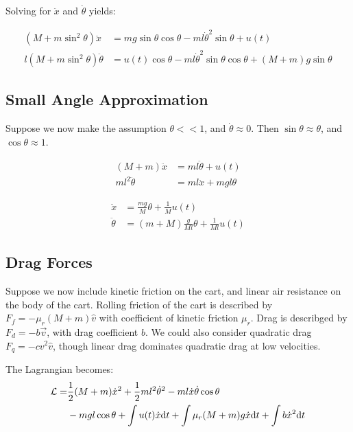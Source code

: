 \documentclass[a4paper,12pt]{article}
\begin{document}
Solving for $\ddot{x}$ and $\ddot{\theta}$ yields:

\begin{align}
    (M+m\sin^2\theta)\ddot{x} &=
        mg\sin\theta \cos\theta - ml\dot{\theta}^2 \sin\theta + u(t) \\
    l(M+m\sin^2\theta) \ddot{\theta} &=
        u(t) \cos\theta - ml\dot{\theta}^2 \sin\theta \cos\theta + (M+m)g\sin\theta
\end{align}

\subsection{Small Angle Approximation}

Suppose we now make the assumption $\theta <<1$, and $\dot{\theta} \approx 0$.
Then $\sin\theta \approx \theta$, and $\cos\theta \approx 1$.

\begin{align*}
    (M+m) \ddot{x} &= ml \ddot{\theta} + u(t) \\
    ml^2 \ddot{\theta} &= ml \ddot{x} + mgl \theta
\end{align*}

\begin{align}
    \ddot{x} &= \frac{mg}{M} \theta + \frac{1}{M} u(t) \\
    \ddot{\theta} &= (m+M)\frac{g}{Ml} \theta + \frac{1}{Ml} u(t)
\end{align}


\subsection{Drag Forces}

Suppose we now include kinetic friction on the cart, and linear air resistance
on the body of the cart. Rolling friction of the cart is described by $F_f =
-\mu_r (M+m)\hat{v}$ with coefficient of kinetic friction $\mu_r$. Drag is
describged by $F_d = -b \vec{v}$, with drag coefficient $b$. We could also
consider quadratic drag $F_q = -c v^2 \hat{v}$, though linear drag dominates
quadratic drag at low velocities.

The Lagrangian becomes:
\begin{align*}
    \mathcal{L}
        =& \frac{1}{2} \qty(M+m) \dot{x}^2
        + \frac{1}{2} m l^2 \dot{\theta}^2
        - ml \dot{x} \dot{\theta} \cos \theta \\
        &- mgl \cos \theta + \int u(t) \dot{x} \dd t
        + \int \mu_r(M+m)g \dot{x} \dd t
        + \int b \dot{x}^2 \dd t
\end{align*}
\end{document}
